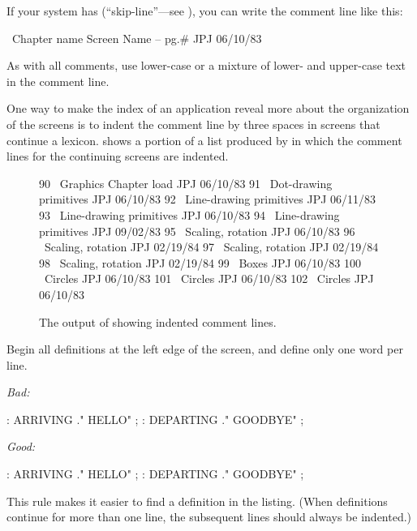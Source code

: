 If your system has \forth{\bs} (``skip-line''---see ), you can
write the comment line like this:
\begin{Code}
\ Chapter name        Screen Name -- pg.#       JPJ 06/10/83
\end{Code}
As with all comments, use lower-case or a mixture of lower- and
upper-case text in the comment line.

One way to make the index of an application reveal more about the
organization of the screens is to indent the comment line by three
spaces in screens that continue a lexicon.   shows a
portion of a list produced by  in which the comment lines
for the continuing screens are indented.%

\begin{figure*}[bbbb]
\caption{The output of  showing indented comment lines.}
\begin{Code}
 90 \ Graphics           Chapter load               JPJ 06/10/83
 91    \ Dot-drawing primitives                     JPJ 06/10/83
 92 \ Line-drawing primitives                       JPJ 06/11/83
 93    \ Line-drawing primitives                    JPJ 06/10/83
 94    \ Line-drawing primitives                    JPJ 09/02/83
 95 \ Scaling, rotation                             JPJ 06/10/83
 96    \ Scaling, rotation                          JPJ 02/19/84
 97    \ Scaling, rotation                          JPJ 02/19/84
 98    \ Scaling, rotation                          JPJ 02/19/84
 99 \ Boxes                                         JPJ 06/10/83
100 \ Circles                                       JPJ 06/10/83
101    \ Circles                                    JPJ 06/10/83
102    \ Circles                                    JPJ 06/10/83
\end{Code}
\end{figure*}

\begin{tip}
Begin all definitions at the left edge of the screen, and define only
one word per line.
\end{tip}
\noindent \emph{Bad:}
\begin{Code}
: ARRIVING   ." HELLO" ;   : DEPARTING   ." GOODBYE" ;
\end{Code}
\noindent \emph{Good:}
\begin{Code}
: ARRIVING   ." HELLO" ;
: DEPARTING   ." GOODBYE" ;
\end{Code}
This rule makes it easier to find a definition in the listing.  (When
definitions continue for more than one line, the subsequent lines
should always be indented.)

